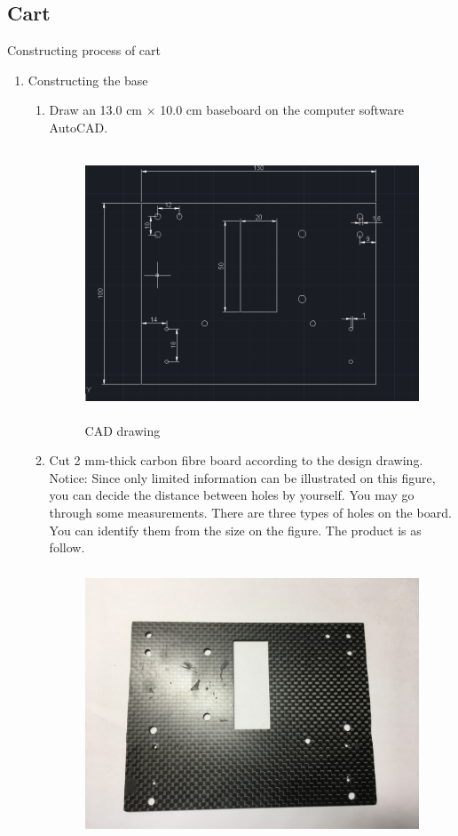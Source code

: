 \subsection{Cart}
Constructing process of cart
\begin{enumerate}
\item Constructing the base
	\begin{enumerate}
	\item	Draw an 13.0 cm $\times$ 10.0 cm baseboard on the computer software AutoCAD.\\
	\begin{figure}[H]
	\begin{center}
	\includegraphics[height=8cm]{figure/procedure/p1}
	\end{center}
 	\caption{CAD drawing \label{fig:cad}}
	\end{figure}
	\item Cut 2 mm-thick carbon fibre board according to the design drawing. Notice: Since only limited information can be illustrated on this figure, you can decide the distance between holes by yourself. You may go through some measurements. There are three types of holes on the board. You can identify them from the size on the figure. The product is as follow. \\
	\begin{figure}[H]
	\begin{center}
	\includegraphics[height=8cm]{figure/procedure/p2}

\end{center}
\end{figure}
\end{enumerate}
\end{enumerate}
